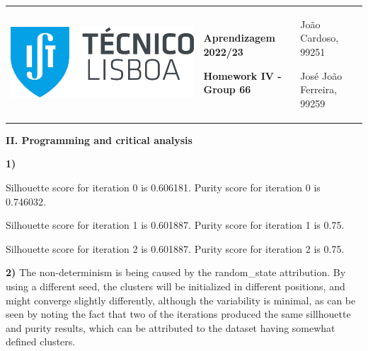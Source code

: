 \documentclass[11pt,a4paper]{article}
\begin{document}
\pagebreak
\color{darkgray}
\hspace{-8.25mm}
\renewcommand\tabularxcolumn[1]{m{#1}}
\begin{tabularx}{1.09\textwidth} {>{\raggedright\arraybackslash}X >{\centering\arraybackslash}X >{\raggedleft\arraybackslash}X}
  \includegraphics[scale=0.2]{tecnico.pdf}                           &
  \textbf{Aprendizagem 2022/23} \par \textbf{Homework IV - Group 66} &
  João Cardoso, 99251 \par José João Ferreira, 99259
\end{tabularx}
\renewcommand\tabularxcolumn[1]{p{#1}}
\color{black}

\begin{center}
  \textbf{II. Programming and critical analysis}
\end{center}

\begin{flushleft}
  \textbf{1)} \par
  Silhouette score for iteration 0 is 0.606181. \hspace{5mm} Purity score for iteration 0 is 0.746032. \par
  Silhouette score for iteration 1 is 0.601887. \hspace{5mm} Purity score for iteration 1 is 0.75. \par
  Silhouette score for iteration 2 is 0.601887. \hspace{5mm} Purity score for iteration 2 is 0.75. \par
\end{flushleft}

\begin{flushleft}
  \textbf{2)}
  The non-determinism is being caused by the random\_state attribution.
  By using a different seed, the clusters will be initialized in different positions, and might converge slightly differently, although the variability is minimal, as can be seen by noting the fact that two of the iterations produced the same sillhouette and purity results, which can be attributed to the dataset having somewhat defined clusters.
\end{flushleft}
\end{document}
